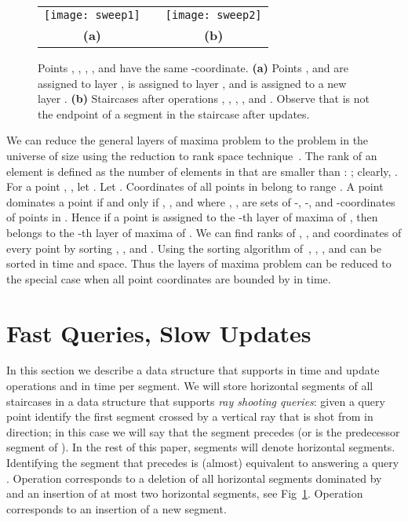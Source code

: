 \documentclass[10pt]{llncs}
\begin{document}
\begin{figure}[tbh]
  \centering
  \begin{tabular}{ccc}
  \texttt{[image: sweep1]} & \hspace*{.7cm} &
  \texttt{[image: sweep2]} \\
  {\bf (a)}   &  & {\bf(b)}  \\
  \end{tabular}
  \caption{Points , , , , and  have the same -coordinate. {\bf (a)} Points ,  and  are assigned to layer ,  is assigned to layer , and  is assigned to a new layer . 
{\bf (b)} Staircases after operations , , , , and . Observe that  is not the endpoint of a segment in the staircase  after updates.
     }
  \label{fig:sweep}
\end{figure}

We can reduce the general layers of maxima problem to the problem in the universe of size  using the reduction to rank space
 technique~\cite{O88,GBT84}. 
The rank of an element  is defined as the number of elements in  
that are smaller than : ; clearly, 
. 
For a point , , 
 let . 
Let . Coordinates of all points in  
belong to range . 
A point  dominates a point  if and only if 
, , and 
 where , ,  are sets 
of -, -, and -coordinates of points in .  
Hence if a  point  is assigned to the 
-th layer of maxima of , then  belongs to the -th 
layer of maxima of . 
We can find ranks of , , and coordinates of every point by 
sorting , , and . Using the sorting algorithm of~\cite{H04}, 
, , and  can be sorted in  time and  
space. 
Thus the layers of maxima problem can be reduced to the special case when 
all point coordinates are bounded by  in  time.  


\section{Fast Queries, Slow Updates}
\label{sec:fast}
In this section we describe a data structure that supports  in 
 time and update operations  and 
 in  time 
per segment.  We will store horizontal segments of all staircases 
in a data structure that supports \emph{ray shooting queries}: 
given a query point  identify the first segment  crossed by a vertical 
ray that is shot from  in  direction; in this case 
we will say that the segment  precedes  (or  is the predecessor
 segment of ). In the rest of this paper, segments will denote horizontal
 segments.
Identifying the segment that precedes  
is (almost) equivalent to answering a query .
Operation  corresponds to a deletion of all 
horizontal segments dominated by  and an insertion of at most two 
horizontal segments, see Fig~\ref{fig:sweep}. 
Operation  corresponds to an insertion of a new segment.  
\end{document}
